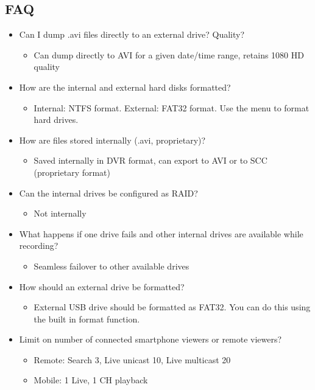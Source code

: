 \documentclass[11pt,oneside]{book}
\begin{document}
\subsection*{FAQ}

\begin{itemize}
\item Can I dump .avi files directly to an external drive? Quality?
    \begin{itemize}
    \item Can dump directly to AVI for a given date/time range, retains 1080 HD quality
    \end{itemize}
\item How are the internal and external hard disks formatted?
    \begin{itemize}
    \item Internal: NTFS format. External: FAT32 format. Use the menu to format hard drives.
    \end{itemize}
\item How are files stored internally (.avi, proprietary)?
    \begin{itemize}
    \item Saved internally in DVR format, can export to AVI or to SCC (proprietary format)
    \end{itemize}
\item Can the internal drives be configured as RAID?
    \begin{itemize}
    \item Not internally
    \end{itemize}
\item What happens if one drive fails and other internal drives are available while recording?
    \begin{itemize}
    \item Seamless failover to other available drives
    \end{itemize}
\item How should an external drive be formatted?
    \begin{itemize}
    \item External USB drive should be formatted as FAT32. You can do this using the built in format function.
    \end{itemize}
\item Limit on number of connected smartphone viewers or remote viewers?
    \begin{itemize}
    \item Remote: Search 3, Live unicast 10, Live multicast 20
    \item Mobile: 1 Live, 1 CH playback
    \end{itemize}
\end{itemize}
\end{document}
